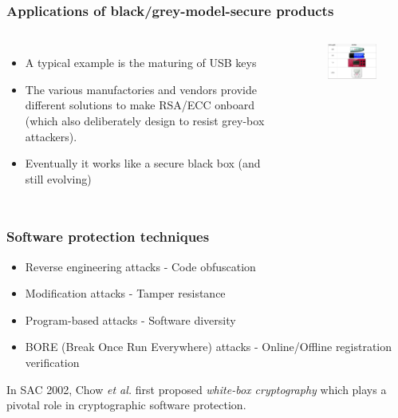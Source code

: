 \documentclass{beamer}
\begin{document}
\frame
{
\frametitle{Applications of black/grey-model-secure products}
\begin{columns}[c]
\begin{itemize}
\item A typical example is the maturing of USB keys
\item The various manufactories and vendors provide different solutions to make RSA/ECC onboard (which also deliberately design to resist grey-box attackers).
\item Eventually it works like a secure black box (and still evolving)
\end{itemize}
\begin{figure}[htbp]
\centering
  \includegraphics[width=4.8cm]{./pics/usbkey.png}
\end{figure}

\end{columns}

}

\frame
{
\frametitle{Software protection techniques}
\begin{itemize}
\item \textcolor[rgb]{1.00, 0.00, 0.00}{Reverse engineering attacks} - \textcolor[rgb]{0.00,1.00,0.00}{Code obfuscation}

\item \textcolor[rgb]{1.00, 0.00, 0.00}{Modification attacks} - \textcolor[rgb]{0.00,1.00,0.00}{Tamper resistance}

\item \textcolor[rgb]{1.00, 0.00, 0.00}{Program-based attacks} - \textcolor[rgb]{0.00,1.00,0.00}{Software diversity}

\item \textcolor[rgb]{1.00, 0.00, 0.00}{BORE (Break Once Run Everywhere) attacks} - \textcolor[rgb]{0.00,1.00,0.00}{Online/Offline registration verification}
\end{itemize}

In SAC 2002, Chow \textit{et al.} first proposed \textit{white-box cryptography} which plays a pivotal role in cryptographic software protection.
}
\end{document}
